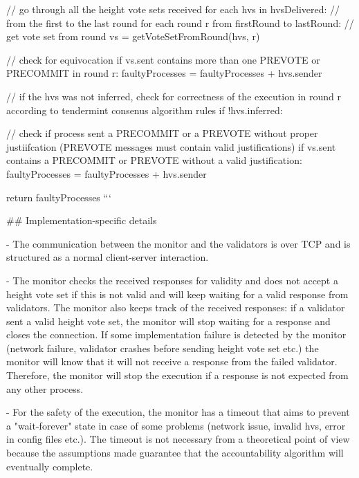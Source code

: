 \documentclass[a4paper,11pt,oneside]{report}
\begin{document}
\begin{markdown}
        // go through all the height vote sets received
        for each hvs in hvsDelivered:
            // from the first to the last round    
            for each round r from firstRound to lastRound: 
                // get vote set from round
                vs = getVoteSetFromRound(hvs, r)
                
                // check for equivocation
                if vs.sent contains more than one PREVOTE or PRECOMMIT in round r:
                    faultyProcesses = faultyProcesses + hvs.sender                
                
                // if the hvs was not inferred, check for correctness of the execution in round r according to tendermint consenus algorithm rules  
                if !hvs.inferred:
                    
                    // check if process sent a PRECOMMIT or a PREVOTE without proper justiifcation (PREVOTE messages must contain valid justifications) 
                    if vs.sent contains a PRECOMMIT or PREVOTE without a valid justification:
                        faultyProcesses = faultyProcesses + hvs.sender
                        
                        
        return faultyProcesses
    ```        
                
## Implementation-specific details

- The communication between the monitor and the validators is over TCP and is structured as a normal client-server interaction.  

- The monitor checks the received responses for validity and does not accept a height vote set if this is not valid and will keep waiting for a valid response from validators. 
The monitor also keeps track of the received responses: if a validator sent a valid height vote set, the monitor will stop waiting for a response and closes the connection.
If some implementation failure is detected by the monitor (network failure, validator crashes before sending height vote set etc.) the monitor will know that it will not receive a response from the failed validator. 
Therefore, the monitor will stop the execution if a response is not expected from any other process. 

- For the safety of the execution, the monitor has a timeout that aims to prevent a "wait-forever" state in case of some problems (network issue, invalid hvs, error in config files etc.). The timeout is not necessary from a theoretical point of view because the assumptions made guarantee that the accountability algorithm will eventually complete.

\end{markdown}
\end{document}

